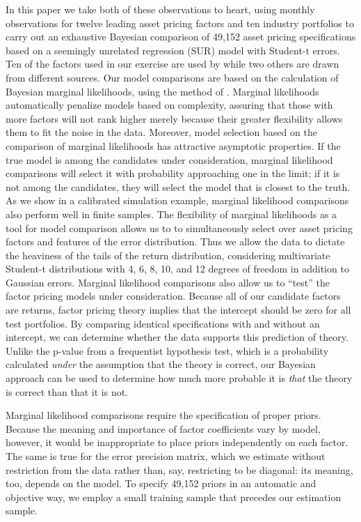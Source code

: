 In this paper we take both of these observations to heart, using monthly observations for twelve leading asset pricing factors and ten industry portfolios to carry out an exhaustive Bayesian comparison of 49,152 asset pricing specifications based on a seemingly unrelated regression (SUR) model with Student-t errors.
Ten of the factors used in our exercise are used by \cite{harvey2015lucky} while two others are drawn from different sources.
Our model comparisons are based on the calculation of Bayesian marginal likelihoods, using the method of \cite{chib1995marginal}.
Marginal likelihoods automatically penalize models based on complexity, assuring that those with more factors will not rank higher merely because their greater flexibility allows them to fit the noise in the data. 
Moreover, model selection based on the comparison of marginal likelihoods has attractive asymptotic properties.
If the true model is among the candidates under consideration, marginal likelihood comparisons will select it with probability approaching one in the limit; if it is not among the candidates, they will select the model that is closest to the truth.
As we show in a calibrated simulation example, marginal likelihood comparisons also perform well in finite samples.
The flexibility of marginal likelihoods as a tool for model comparison allows us to to simultaneously select over asset pricing factors and features of the error distribution.
Thus we allow the data to dictate the heaviness of the tails of the return distribution, considering multivariate Student-t distributions with 4, 6, 8, 10, and 12 degrees of freedom in addition to Gaussian errors. 
Marginal likelihood comparisons also allow us to ``test'' the factor pricing models under consideration.
Because all of our candidate factors are returns, factor pricing theory implies that the intercept should be zero for all test portfolios. 
By comparing identical specifications with and without an intercept, we can determine whether the data supports this prediction of theory.
Unlike the p-value from a frequentist hypothesis test, which is a probability calculated \emph{under} the assumption that the theory is correct, our Bayesian approach can be used to determine how much more probable it is \emph{that} the theory is correct than that it is not.

Marginal likelihood comparisons require the specification of proper priors.
Because the meaning and importance of factor coefficients vary by model, however, it would be inappropriate to place priors independently on each factor.
The same is true for the error precision matrix, which we estimate without restriction from the data rather than, say, restricting to be diagonal: its meaning, too, depends on the model.
To specify 49,152 priors in an automatic and objective way, we employ a small training sample that precedes our estimation sample.

